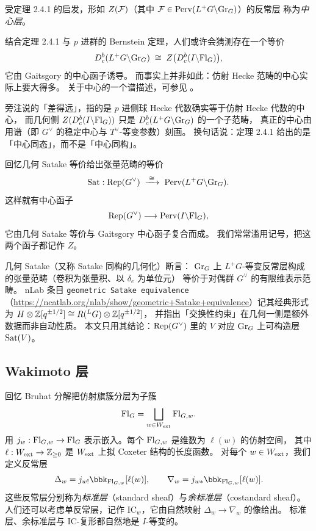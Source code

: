 受定理 2.4.1 的启发，形如 $Z(\mathcal{F})$（其中 $\mathcal{F}\in\mathrm{Perv}(L^+G\backslash\mathrm{Gr}_G)$）的反常层
称为\emph{中心层}。

\begin{aside}
结合定理 2.4.1 与 $p$ 进群的 Bernstein 定理，人们或许会猜测存在一个等价
\[
D^b_c(L^+G\backslash\mathrm{Gr}_G)\;\cong\; Z\bigl(D^b_c(I\backslash\mathrm{Fl}_G)\bigr),
\]
它由 Gaitsgory 的中心函子诱导。
而事实上并非如此：仿射 Hecke 范畴的中心实际上要大得多。
关于中心的一个谱描述，可参见 \cite{BNP}。
\end{aside}

\begin{yizhu}[术语背景：旁注 2.4.2 里的「中心」]
旁注说的「差得远」，指的是 $p$ 进侧球 Hecke 代数确实等于仿射 Hecke 代数的中心，
而几何侧 $Z(D^b_c(I\backslash\mathrm{Fl}_G))$ 只是 $D^b_c(L^+G\backslash\mathrm{Gr}_G)$ 的一个子范畴，
真正的中心由 \cite{BNP} 用谱（即 $G^\vee$ 的稳定中心与 $T^\vee$-等变参数）刻画。
换句话说：定理 2.4.1 给出的是「中心同态」，而不是「中心同构」。
\end{yizhu}

\begin{remark}
回忆几何 Satake 等价给出张量范畴的等价
\[
\mathrm{Sat}:\mathrm{Rep}(G^\vee)\;\xrightarrow{\;\cong\;}\;\mathrm{Perv}(L^+G\backslash\mathrm{Gr}_G).
\]
这样就有中心函子
\[
\mathrm{Rep}(G^\vee)\longrightarrow\mathrm{Perv}(I\backslash\mathrm{Fl}_G),
\]
它由几何 Satake 等价与 Gaitsgory 中心函子复合而成。
我们常常滥用记号，把这两个函子都记作 $Z$。
\end{remark}

\begin{yizhu}
几何 Satake（又称 Satake 同构的几何化）断言：
$\mathrm{Gr}_G$ 上 $L^+G$-等变反常层构成的张量范畴（卷积为张量积、以 $\delta_e$ 为单位元）
等价于对偶群 $G^\vee$ 的有限维表示范畴。
nLab 条目 \texttt{geometric Satake equivalence}
（\url{https://ncatlab.org/nlab/show/geometric+Satake+equivalence}）记其经典形式为
$H\otimes\mathbb{Z}[q^{\pm1/2}]\cong R({}^LG)\otimes\mathbb{Z}[q^{\pm1/2}]$，
并指出「交换性约束」在几何一侧是额外数据而非自动性质。
本文只用其结论：$\mathrm{Rep}(G^\vee)$ 里的 $V$ 对应 $\mathrm{Gr}_G$ 上可构造层 $\mathrm{Sat}(V)$。
\end{yizhu}

\subsection{Wakimoto 层}\label{sec:wakimoto}

回忆 Bruhat 分解把仿射旗簇分层为子簇
\[
\mathrm{Fl}_G=\bigsqcup_{w\in W_{\mathrm{ext}}}\mathrm{Fl}_{G,w}.
\]
用 $j_w:\mathrm{Fl}_{G,w}\to\mathrm{Fl}_G$ 表示嵌入。每个 $\mathrm{Fl}_{G,w}$ 是维数为 $\ell(w)$ 的仿射空间，
其中 $\ell:W_{\mathrm{ext}}\to\mathbb{Z}_{\ge0}$ 是 $W_{\mathrm{ext}}$ 上拟 Coxeter 结构的长度函数。
对每个 $w\in W_{\mathrm{ext}}$，我们定义反常层
\[
\Delta_w=j_{w!}\bbk_{\Fl_{G,w}}[\ell(w)],
\qquad
\nabla_w=j_{w*}\bbk_{\Fl_{G,w}}[\ell(w)].
\]
这些反常层分别称为\emph{标准层}（standard sheaf）与\emph{余标准层}（costandard sheaf）。
人们还可以考虑单反常层，记作 $\mathrm{IC}_w$，它由自然映射 $\Delta_w\to\nabla_w$ 的像给出。
标准层、余标准层与 $\mathrm{IC}$-复形都自然地是 $I$-等变的。

